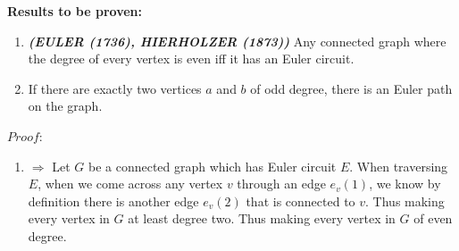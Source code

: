 \documentclass[12pt, fullpage]{article}
\begin{document}
\textbf{Results to be proven: }

\begin{enumerate}
	\item \textit{\textbf{(EULER (1736), HIERHOLZER (1873))}} Any connected graph where the degree of every vertex is even iff it has an Euler circuit.
	\item If there are exactly two vertices $a$ and $b$ of odd degree, there is an Euler path on the graph.
\end{enumerate}
$Proof:$
\begin{enumerate}
	\item
 	$\Rightarrow$ Let $G$ be a connected graph which has Euler circuit $E$. When traversing $E$, when we come across any vertex $v$ through an edge $e_v(1)$, we know by definition there is another edge $e_v(2)$ that is connected to $v$. Thus making every vertex in $G$ at least degree two. Thus making every vertex in $G$ of even degree. \\
 	

\end{enumerate}
\end{document}
